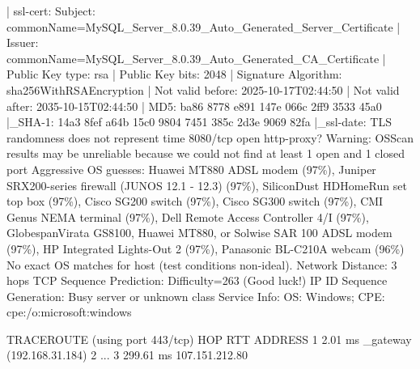 \documentclass[
]{article}
\newenvironment{Shaded}{}{}
\newcommand{\NormalTok}[1]{#1}
\begin{document}
\begin{Shaded}
\begin{Highlighting}[]
\NormalTok{| ssl{-}cert: Subject: commonName=MySQL\_Server\_8.0.39\_Auto\_Generated\_Server\_Certificate}
\NormalTok{| Issuer: commonName=MySQL\_Server\_8.0.39\_Auto\_Generated\_CA\_Certificate}
\NormalTok{| Public Key type: rsa}
\NormalTok{| Public Key bits: 2048}
\NormalTok{| Signature Algorithm: sha256WithRSAEncryption}
\NormalTok{| Not valid before: 2025{-}10{-}17T02:44:50}
\NormalTok{| Not valid after:  2035{-}10{-}15T02:44:50}
\NormalTok{| MD5:   ba86 8778 e891 147e 066c 2ff9 3533 45a0}
\NormalTok{|\_SHA{-}1: 14a3 8fef a64b 15c0 9804 7451 385c 2d3e 9069 82fa}
\NormalTok{|\_ssl{-}date: TLS randomness does not represent time}
\NormalTok{8080/tcp open  http{-}proxy?}
\NormalTok{Warning: OSScan results may be unreliable because we could not find at least 1 open and 1 closed port}
\NormalTok{Aggressive OS guesses: Huawei MT880 ADSL modem (97\%), Juniper SRX200{-}series firewall (JUNOS 12.1 {-} 12.3) (97\%), SiliconDust HDHomeRun set top box (97\%), Cisco SG200 switch (97\%), Cisco SG300 switch (97\%), CMI Genus NEMA terminal (97\%), Dell Remote Access Controller 4/I (97\%), GlobespanVirata GS8100, Huawei MT880, or Solwise SAR 100 ADSL modem (97\%), HP Integrated Lights{-}Out 2 (97\%), Panasonic BL{-}C210A webcam (96\%)}
\NormalTok{No exact OS matches for host (test conditions non{-}ideal).}
\NormalTok{Network Distance: 3 hops}
\NormalTok{TCP Sequence Prediction: Difficulty=263 (Good luck!)}
\NormalTok{IP ID Sequence Generation: Busy server or unknown class}
\NormalTok{Service Info: OS: Windows; CPE: cpe:/o:microsoft:windows}

\NormalTok{TRACEROUTE (using port 443/tcp)}
\NormalTok{HOP RTT       ADDRESS}
\NormalTok{1   2.01 ms   \_gateway (192.168.31.184)}
\NormalTok{2   ...}
\NormalTok{3   299.61 ms 107.151.212.80}


\end{Highlighting}
\end{Shaded}
\end{document}

